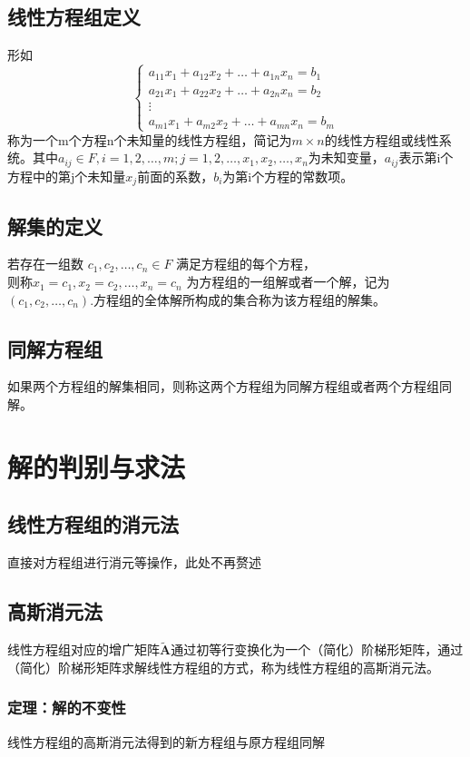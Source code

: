 \documentclass[a4paper]{ctexbook}
\begin{document}
\section{线性方程组定义}
形如
\[\begin{cases}
    a_{11}x_1 + a_{12}x_2 + \dots + a_{1n}x_n = b_1\\
    a_{21}x_1 + a_{22}x_2 + \dots + a_{2n}x_n = b_2\\
    \vdots \\
    a_{m1}x_1 + a_{m2}x_2 + \dots + a_{mn}x_n = b_m
\end{cases}
\]
称为一个m个方程n个未知量的线性方程组，简记为\(m \times n\)的线性方程组或线性系统。其中\(a_{ij} \in F, i=1,2,\dots ,m; j=1,2,\dots,  x_1 , x_2 , \dots , x_n\)为未知变量，\(a_{ij}\)表示第i个方程中的第j个未知量\(x_j\)前面的系数，\(b_i\)为第i个方程的常数项。

\section{解集的定义}
若存在一组数 \(c_1,c_2,\dots ,c_n \in F\) 满足方程组的每个方程，\\则称\(x_1=c_1,x_2=c_2,\dots ,x_n=c_n\) 为方程组的一组解或者一个解，记为\((c_1,c_2,\dots ,c_n)\).方程组的全体解所构成的集合称为该方程组的解集。

\section{同解方程组}
如果两个方程组的解集相同，则称这两个方程组为同解方程组或者两个方程组同解。

\chapter{解的判别与求法}
\section{线性方程组的消元法} 直接对方程组进行消元等操作，此处不再赘述
\section{高斯消元法} 线性方程组对应的增广矩阵\(\mathbf {\tilde A}\)通过初等行变换化为一个（简化）阶梯形矩阵，通过（简化）阶梯形矩阵求解线性方程组的方式，称为线性方程组的高斯消元法。
\subsection{定理：解的不变性} 线性方程组的高斯消元法得到的新方程组与原方程组同解
\end{document}
